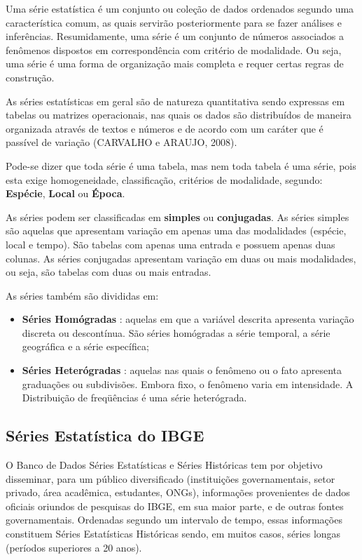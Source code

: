 \inic Uma série estatística é um conjunto ou coleção de dados ordenados segundo uma característica comum, as quais servirão posteriormente para se fazer análises e inferências. Resumidamente, uma série é um conjunto de números associados a fenômenos dispostos em correspondência com critério de modalidade. Ou seja, uma série é uma forma de organização mais completa e requer certas regras de construção.\vskip0.3cm


\inic As séries estatísticas em geral são de natureza quantitativa sendo expressas em tabelas ou matrizes operacionais, nas quais os dados são distribuídos de maneira organizada através de textos e números e de acordo com um caráter que é passível de variação (CARVALHO e ARAUJO, 2008).\vskip0.3cm

Pode-se dizer que toda série é uma tabela, mas nem toda tabela é
uma série, pois esta exige homogeneidade, classificação, critérios
de modalidade, segundo: \textbf{Espécie}, \textbf{Local} ou
\textbf{Época}. \vskip0.3cm

As séries podem ser classificadas em \textbf{simples} ou \textbf{conjugadas}. As séries simples são aquelas que apresentam variação em apenas uma das modalidades (espécie, local e tempo). São tabelas com apenas uma entrada e possuem apenas duas colunas. As séries conjugadas apresentam variação em duas ou mais modalidades, ou seja, são tabelas com duas ou mais entradas.\vskip0.3cm

As séries também são divididas em:


\begin{itemize}
  \item \textbf{Séries Homógradas} : aquelas em que a variável descrita apresenta variação discreta ou descontínua. São séries homógradas a série temporal, a série geográfica e a série específica;
 \item \textbf{Séries Heterógradas} : aquelas nas quais o fenômeno ou o fato apresenta graduações ou subdivisões. Embora fixo, o fenômeno varia em intensidade. A Distribuição de freqüências é uma série heterógrada.
\end{itemize}

\newpage
\subsection{Séries Estatística do IBGE}

O Banco de Dados Séries Estatísticas e Séries Históricas tem por objetivo disseminar, para um público diversificado (instituições governamentais, setor privado, área acadêmica, estudantes, ONGs), informações provenientes de dados oficiais oriundos de pesquisas do IBGE, em sua maior parte, e de outras fontes governamentais. Ordenadas segundo um intervalo de tempo, essas informações constituem Séries Estatísticas Históricas sendo, em muitos casos, séries longas (períodos superiores a 20 anos). \vskip0.3cm

